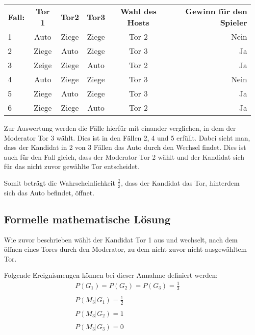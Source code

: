 \begin{tabular}[h]{lccccr}
    \textbf{Fall:} & \textbf{Tor 1} & \textbf{Tor2} & \textbf{Tor3} & \textbf{Wahl des Hosts} & \textbf{Gewinn für den Spieler} \\
    1 & Auto & Ziege & Ziege & Tor 2 & Nein\\
    2 & Ziege & Auto & Ziege & Tor 3 & Ja\\
    3 & Zeige & Ziege & Auto & Tor 2 & Ja\\
    4 & Auto & Ziege & Ziege & Tor 3 & Nein\\
    5 & Ziege & Auto & Ziege & Tor 3 & Ja\\
    6 & Ziege & Ziege & Auto & Tor 2 & Ja\\
\end{tabular}

Zur Auswertung werden die Fälle hierfür mit einander verglichen, in dem der Moderator Tor 3 wählt. Dies ist in den Fällen 2, 4 und 5 erfüllt.
Dabei sieht man, dass der Kandidat in 2 von 3 Fällen das Auto durch den Wechsel findet. Dies ist auch für den Fall gleich, dass der Moderator Tor 2 wählt und 
der Kandidat sich für das nicht zuvor gewählte Tor entscheidet.

Somit beträgt die Wahrscheinlichkeit $\frac{2}{3}$, dass der Kandidat das Tor, hinterdem sich das Auto befindet, öffnet.

\newpage
\subsection{Formelle mathematische Lösung}
Wie zuvor beschrieben wählt der Kandidat Tor 1 aus und wechselt, nach dem öffnen eines Tores durch den Moderator, zu dem nicht zuvor nicht ausgewähltem Tor.

Folgende Ereignismengen können bei dieser Annahme definiert werden:
\begin{equation} \label{eq1}
    \begin{split}
        P(G_1) = P(G_2) = P(G_3) = \frac{1}{3} 
        \\
        \\
        P(M_3 | G_1) = \frac{1}{2} 
        \\
        \\
        P(M_3 | G_2) = 1 
        \\
        \\ 
        P(M_3 | G_3) = 0
    \end{split}
\end{equation}

